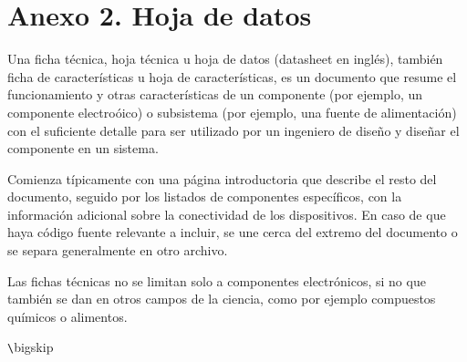 \chapter{Anexo 2. Hoja de datos}\label{anexo2}

Una ficha técnica, hoja técnica u hoja de datos (datasheet en inglés), también ficha de características u hoja de características, es un documento que resume el funcionamiento y otras características de un componente (por ejemplo, un componente electroóico) o subsistema (por ejemplo, una fuente de alimentación) con el suficiente detalle para ser utilizado por un ingeniero de diseño y diseñar el componente en un sistema.

Comienza típicamente con una página introductoria que describe el resto del documento, seguido por los listados de componentes específicos, con la información adicional sobre la conectividad de los dispositivos. En caso de que haya código fuente relevante a incluir, se une cerca del extremo del documento o se separa generalmente en otro archivo.

Las fichas técnicas no se limitan solo a componentes electrónicos, si no que también se dan en otros campos de la ciencia, como por ejemplo compuestos químicos o alimentos.




\verb+\+bigskip



\endinput 